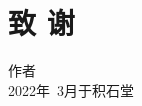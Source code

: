 \section*{致 \quad \quad 谢}\parskip=-1mm


\hfill\phantom{} \hfill  作者~~~~~~~~~~~~~~\\
\hfill\phantom{}\hfill2022年~3月于积石堂